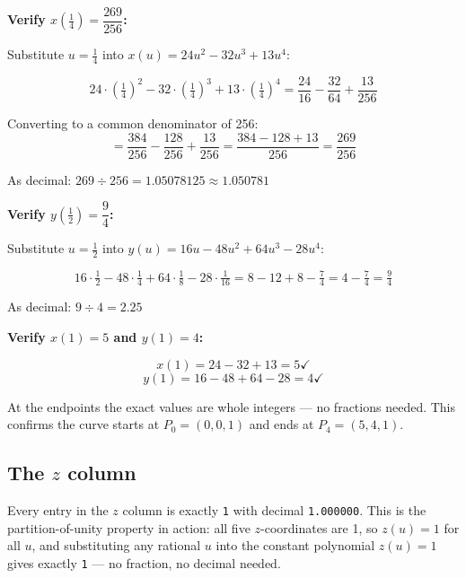 \documentclass[12pt, a4paper]{article}
\newcommand{\cd}[1]{\texttt{#1}}
\begin{document}
\begin{examplebox}
\textbf{Verify $x\!\left(\tfrac{1}{4}\right) = \dfrac{269}{256}$:}

\medskip
Substitute $u = \tfrac{1}{4}$ into $x(u) = 24u^2 - 32u^3 + 13u^4$:

\[
  24 \cdot \left(\tfrac{1}{4}\right)^2
  - 32 \cdot \left(\tfrac{1}{4}\right)^3
  + 13 \cdot \left(\tfrac{1}{4}\right)^4
  = \frac{24}{16} - \frac{32}{64} + \frac{13}{256}
\]

Converting to a common denominator of 256:
\[
  = \frac{384}{256} - \frac{128}{256} + \frac{13}{256}
  = \frac{384 - 128 + 13}{256}
  = \frac{269}{256}
\]

As decimal: $269 \div 256 = 1.05078125 \approx 1.050781$ \checkmark
\end{examplebox}

\begin{examplebox}
\textbf{Verify $y\!\left(\tfrac{1}{2}\right) = \dfrac{9}{4}$:}

\medskip
Substitute $u = \tfrac{1}{2}$ into $y(u) = 16u - 48u^2 + 64u^3 - 28u^4$:

\[
  16 \cdot \tfrac{1}{2}
  - 48 \cdot \tfrac{1}{4}
  + 64 \cdot \tfrac{1}{8}
  - 28 \cdot \tfrac{1}{16}
  = 8 - 12 + 8 - \tfrac{7}{4}
  = 4 - \tfrac{7}{4}
  = \tfrac{9}{4}
\]

As decimal: $9 \div 4 = 2.25$ \checkmark
\end{examplebox}

\begin{examplebox}
\textbf{Verify $x(1) = 5$ and $y(1) = 4$:}

\[
  x(1) = 24 - 32 + 13 = 5 \checkmark
\]
\[
  y(1) = 16 - 48 + 64 - 28 = 4 \checkmark
\]

At the endpoints the exact values are whole integers ---
no fractions needed. This confirms the curve starts at $P_0 = (0,0,1)$
and ends at $P_4 = (5,4,1)$.
\end{examplebox}

\subsection{The $z$ column}

Every entry in the $z$ column is exactly \cd{1} with decimal
\cd{1.000000}.
This is the partition-of-unity property in action:
all five $z$-coordinates are 1, so $z(u) = 1$ for all $u$,
and substituting any rational $u$ into the constant polynomial
$z(u) = 1$ gives exactly \cd{1} --- no fraction, no decimal needed.
\end{document}

